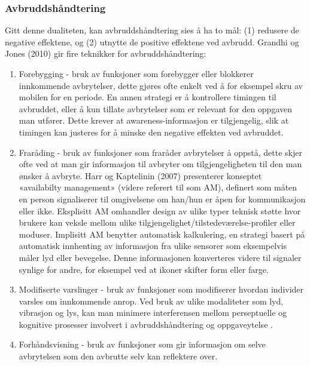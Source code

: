 \subsubsection{Avbruddshåndtering}
Gitt denne dualiteten, kan avbruddshåndtering sies å ha to mål: (1) redusere de negative effektene, og (2) utnytte de positive effektene ved avbrudd. Grandhi og Jones (2010) gir fire teknikker for avbruddshåndtering:
\begin{enumerate}        
\item Forebygging - bruk av funksjoner som forebygger eller blokkerer innkommende avbrytelser, dette gjøres ofte enkelt ved å for eksempel skru av mobilen for en periode. En annen strategi er å kontrollere timingen til avbruddet, eller å kun tillate avbrytelser som er relevant for den oppgaven man utfører. Dette krever at awareness-informasjon er tilgjengelig, slik at timingen kan justeres for å minske den negative effekten ved avbruddet.

\item Fraråding - bruk av funksjoner som fraråder avbrytelser å oppstå, dette skjer ofte ved at man gir informasjon til avbryter om tilgjengeligheten til den man ønsker å avbryte. Harr og Kaptelinin (2007) presenterer konseptet «availabilty management» (videre referert til som AM), definert som måten en person signaliserer til omgivelsene om han/hun er åpen for kommunikasjon eller ikke.
\noindent
Eksplisitt AM omhandler design av ulike typer teknisk støtte hvor brukere kan veksle mellom ulike tilgjengelighet/tilstedeværelse-profiler eller moduser. Implisitt AM benytter automatisk kalkulering, en strategi basert på automatisk innhenting  av informasjon fra ulike sensorer som eksempelvis måler lyd eller bevegelse. Denne informasjonen konverteres videre til signaler synlige for andre, for eksempel ved at ikoner skifter form eller farge.  

\item Modifiserte varslinger - bruk av funksjoner som modifiserer hvordan individer varsles om innkommende anrop. Ved bruk av ulike modaliteter som lyd, vibrasjon og lys, kan man minimere interferensen mellom perseptuelle og kognitive prosesser involvert i avbruddshåndtering og oppgaveytelse \cite{Harr07}.

\item Forhåndsvisning - bruk av funksjoner som gir informasjon om selve avbrytelsen som den avbrutte selv kan reflektere over.   
\end{enumerate}

